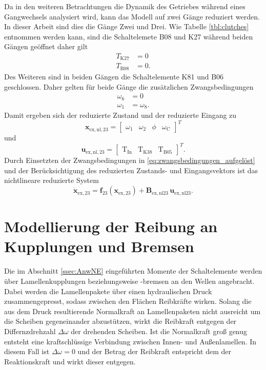 Da in den weiteren Betrachtungen die Dynamik des Getriebes während eines Gangwechsels analysiert wird, kann das Modell auf zwei Gänge reduziert werden. In dieser Arbeit sind dies die Gänge Zwei und Drei. Wie Tabelle \ref{tbl:clutches} entnommen werden kann, sind die Schaltelemete B08 und K27 während beiden Gängen geöffnet daher gilt  
\begin{subequations}
\begin{align*}
T_\mathrm{K27} &= 0 \\
T_\mathrm{B08} &= 0.
\end{align*}
\end{subequations}
Des Weiteren sind in beiden Gängen die Schaltelemente K81 und B06 geschlossen. Daher gelten für beide Gänge die zusätzlichen Zwangsbedingungen
\begin{subequations}
\begin{align}
\omega_6 &= 0\\
\omega_1 &= \omega_8.
\end{align}
\end{subequations}
Damit ergeben sich der reduzierte Zustand und der reduzierte Eingang zu
\begin{equation}
\pmb{x}_\mathrm{ex,nl,23} = \begin{bmatrix} \omega_1 & \omega_2 & \phi & \omega_\mathrm{C}\end{bmatrix}^T
\end{equation}
und
\begin{equation}\label{eq:u_exnl23}
\pmb{u}_\mathrm{ex,nl,23} = \begin{bmatrix} \mathrm{T}_{\mathrm{In}} & \mathrm{T}_{\mathrm{K38}} & \mathrm{T}_{\mathrm{B05}} \end{bmatrix}^T.
\end{equation}
Durch Einsetzten der Zwangsbedingungen in \eqref{eq:zwangsbedingungen_aufgelöst} und der Berücksichtigung des reduzierten Zustands- und  Eingangsvektors ist das nichtlineare reduzierte System
\begin{equation}\label{eq:sys_nl23}
\dot{\pmb{x}}_\mathrm{ex,23} = \pmb{f}_{23}(\pmb{x}_\mathrm{ex,23}) + \pmb{B}_\mathrm{ex,nl23}\,\pmb{u}_\mathrm{ex,nl23}.
\end{equation}


\section{Modellierung der Reibung an Kupplungen und Bremsen} \label{sec:mod_reib}
Die im Abschnitt \ref{ssec:AnwNE} eingeführten Momente der Schaltelemente werden über Lamellenkupplungen beziehungsweise -bremsen an den Wellen angebracht. Dabei werden die Lamellenpakete über einen hydraulischen Druck zusammengepresst, sodass zwischen den Flächen Reibkräfte wirken. Solang die aus dem Druck resultierende Normalkraft an Lamellenpaketen nicht ausreicht um die Scheiben gegeneinander abzustützen, wirkt die Reibkraft entgegen der Differnzdrehzahl $\Delta \omega$ der drehenden Scheiben. Ist die Normalkraft groß genug entsteht eine kraftschlüssige Verbindung zwischen Innen- und Außenlamellen. In diesem Fall ist $\Delta \omega = 0$ und der Betrag der Reibkraft entspricht dem der Reaktionskraft und wirkt dieser entgegen.   

